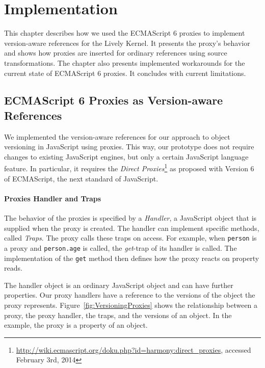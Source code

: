 \chapter{Implementation} \label{chapter:IMPLEMENTATION}

This chapter describes how we used the ECMAScript 6 proxies to implement version-aware references for the Lively Kernel.
It presents the proxy's behavior and shows how proxies are inserted for ordinary references using source transformations.
The chapter also presents implemented workarounds for the current state of ECMAScript 6 proxies.
It concludes with current limitations.


\section{ECMAScript 6 Proxies as Version-aware References} \label{sec:IMPLEMENTATION:1}

We implemented the version-aware references for our approach to object versioning in JavaScript using proxies.
This way, our prototype does not require changes to existing JavaScript engines, but only a certain JavaScript language feature.
In particular, it requires the \emph{Direct Proxies}\footnote{\url{http://wiki.ecmascript.org/doku.php?id=harmony:direct_proxies}, accessed February 3rd, 2014} as proposed with Version 6 of ECMAScript, the next standard of JavaScript.

\subsubsection{Proxies Handler and Traps}

The behavior of the proxies is specified by a \emph{Handler}, a JavaScript object that is supplied when the proxy is created.
The handler can implement specific methods, called \emph{Traps}.
The proxy calls these traps on access.
For example, when \lstinline{person} is a proxy and \lstinline{person.age} is called, the \emph{get}-trap of its handler is called.
The implementation of the \lstinline{get} method then defines how the proxy reacts on property reads.

The handler object is an ordinary JavaScript object and can have further properties.
Our proxy handlers have a reference to the versions of the object the proxy represents.
Figure~\ref{fig:VersioningProxies} shows the relationship between a proxy, the proxy handler, the traps, and the versions of an object.
In the example, the proxy is a property of an object.

